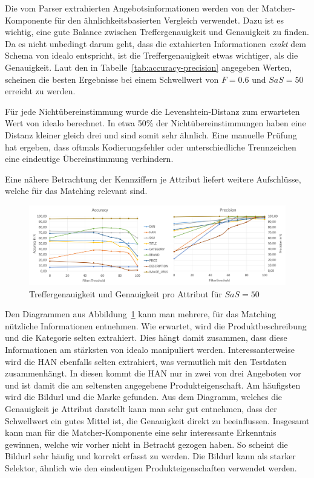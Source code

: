 Die vom Parser extrahierten Angebotsinformationen werden von der Matcher-Komponente für den ähnlichkeitsbasierten
Vergleich verwendet.
Dazu ist es wichtig, eine gute Balance zwischen Treffergenauigkeit und Genauigkeit zu finden.
Da es nicht unbedingt darum geht, dass die extahierten Informationen \textit{exakt} dem Schema von idealo entspricht,
ist die Treffergenauigkeit etwas wichtiger, als die Genauigkeit.
Laut den in Tabelle~\ref{tab:accuracy-precision} angegeben Werten, scheinen die besten Ergebnisse bei einem
Schwellwert von $F=0.6$ und $SaS=50$ erreicht zu werden.

Für jede Nichtübereinstimmung wurde die Levenshtein-Distanz zum erwarteten Wert von idealo berechnet.
In etwa 50\% der Nichtübereinstimmungen haben eine Distanz kleiner gleich drei und sind somit sehr ähnlich.
Eine manuelle Prüfung hat ergeben, dass oftmals Kodierungsfehler oder unterschiedliche Trennzeichen eine eindeutige
Übereinstimmung verhindern.

Eine nähere Betrachtung der Kennziffern je Attribut liefert weitere Aufschlüsse, welche für das Matching relevant sind.

\begin{figure}[H]
    \centering
    \includegraphics[width=\textwidth]{resources/accuracy-and-precision-per-attribute.PNG}
    \caption{Treffergenauigkeit und Genauigkeit pro Attribut für $SaS=50$}
    \label{abb:testdaten}
\end{figure}

Den Diagrammen aus Abbildung~\ref{abb:testdaten} kann man mehrere, für das Matching nützliche Informationen entnehmen.
Wie erwartet, wird die Produktbeschreibung und die Kategorie selten extrahiert.
Dies hängt damit zusammen, dass diese Informationen am stärksten von idealo manipuliert werden.
Interessanterweise wird die HAN ebenfalls selten extrahiert, was vermutlich mit den Testdaten zusammenhängt.
In diesen kommt die HAN nur in zwei von drei Angeboten vor und ist damit die am seltensten angegebene
Produkteigenschaft.
Am häufigsten wird die Bildurl und die Marke gefunden.
Aus dem Diagramm, welches die Genauigkeit je Attribut darstellt kann man sehr gut entnehmen, dass der Schwellwert ein
gutes Mittel ist, die Genauigkeit direkt zu beeinflussen.
Insgesamt kann man für die Matcher-Komponente eine sehr interessante Erkenntnis gewinnen, welche wir vorher nicht in
Betracht gezogen haben.
So scheint die Bildurl sehr häufig und korrekt erfasst zu werden.
Die Bildurl kann als starker Selektor, ähnlich wie den eindeutigen Produkteigenschaften verwendet werden.

